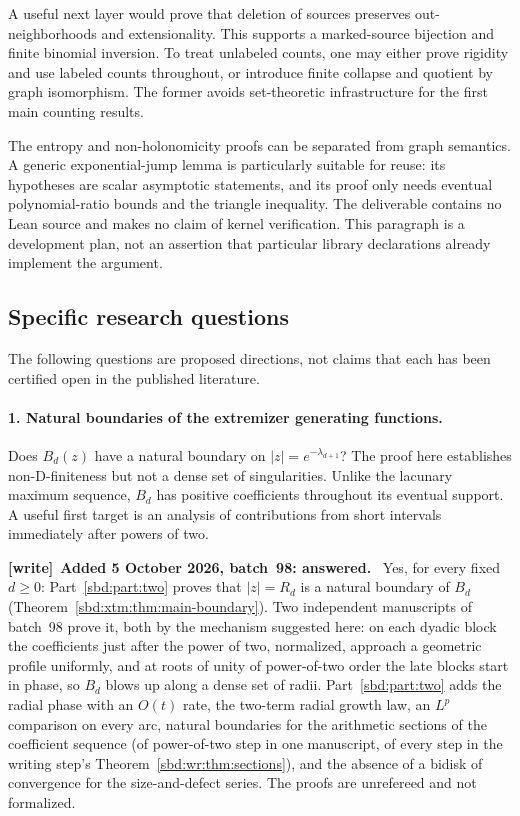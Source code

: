 \documentclass[11pt,a4paper]{article}
\theoremstyle{definition}
\newenvironment{writenote}[1][]{\par\smallskip\begingroup\small
 \noindent\textbf{[write]}\if\relax\detokenize{#1}\relax\else~\textbf{#1.}\fi\ }%
 {\par\endgroup\smallskip}
\begin{document}
A useful next layer would prove that deletion of sources preserves
out-neighborhoods and extensionality. This supports a marked-source
bijection and finite binomial inversion. To treat unlabeled counts,
one may either prove rigidity and use labeled counts throughout, or
introduce finite collapse and quotient by graph isomorphism. The former
avoids set-theoretic infrastructure for the first main counting results.

The entropy and non-holonomicity proofs can be separated from graph
semantics. A generic exponential-jump lemma is particularly suitable for
reuse: its hypotheses are scalar asymptotic statements, and its proof
only needs eventual polynomial-ratio bounds and the triangle inequality.
The deliverable contains no Lean source and makes no claim of kernel
verification. This paragraph is a development plan, not an assertion that
particular library declarations already implement the argument.

\subsection{Specific research questions}\label{sbd:sec:questions}
The following questions are proposed directions, not claims that each
has been certified open in the published literature.

\paragraph{1. Natural boundaries of the extremizer generating functions.}
Does $B_d(z)$ have a natural boundary on $|z|=e^{-\lambda_{d+1}}$?
The proof here establishes non-D-finiteness but not a dense set of
singularities. Unlike the lacunary maximum sequence, $B_d$ has positive
coefficients throughout its eventual support. A useful first target is
an analysis of contributions from short intervals immediately after
powers of two.

\begin{writenote}[Added 5 October 2026, batch~98: answered]
Yes, for every fixed $d\ge0$: Part~\ref{sbd:part:two} proves that
$|z|=R_d$ is a natural boundary of $B_d$
(Theorem~\ref{sbd:xtm:thm:main-boundary}). Two independent manuscripts of
batch~98 prove it, both by the mechanism suggested here: on each dyadic
block the coefficients just after the power of two, normalized, approach a
geometric profile uniformly, and at roots of unity of power-of-two order
the late blocks start in phase, so $B_d$ blows up along a dense set of
radii. Part~\ref{sbd:part:two} adds the radial phase with an $O(t)$ rate,
the two-term radial growth law, an $L^p$ comparison on every arc, natural
boundaries for the arithmetic sections of the coefficient sequence (of
power-of-two step in one manuscript, of every step in the writing step's
Theorem~\ref{sbd:wr:thm:sections}), and the absence of a bidisk of
convergence for the size-and-defect series. The proofs are unrefereed and
not formalized.
\end{writenote}
\end{document}
